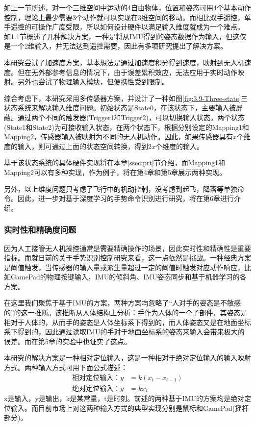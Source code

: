 如上一节所述，对一个三维空间中运动的4自由物体，位置和姿态可用4个基本动作控制，理论上最少需要3个动作就可以实现在3维空间的移动。而相比双手遥控，单手遥控的可操作广度受限，所以如何设计硬件以满足输入维度就成为一个难点。
如1.1节概述了几种解决方案，一种是将从IMU得到的姿态数据作为输入，但这仅是一个2维输入，并无法达到遥控需要，因此有多项研究提出了解决方案\cites{mughees2020gesture,budiyanto2021navigation,muezzinouglu2021intelligent,lee2023wearable,cherpillod2019embodied,kim2022intuitive}。

本研究尝试了加速度方案，基本想法是通过加速度积分得到速度，映射到无人机速度。但在无外部参考信息的情况下，由于误差累积效应，无法应用于实时动作映射。另外也尝试了物理输入模块，但便携性受到限制。

综合考虑下，本研究采用多传感器方案，并设计了一种如图\ref{fig:3.9-Three-state}三状态系统来解决输入维度问题。初始状态是State0，在该状态下，主要输入被屏蔽。通过两个不同的触发器(Trigger1和Trigger2)，可以切换输入状态。两个状态(State1和State2)为可接收输入状态，在两个状态下，根据分别设定的Mapping1和Mapping2，传感器输入被映射为不同的无人机动作。因此，如果传感器具有$x$个维度的输入，则可通过上面的状态空间转换，得到$2x$个维度的输入。

基于该状态系统的具体硬件实现将在本章\ref{ssec:prt}节介绍，而Mapping1和Mapping2可以有多种实现，作为例子，将在第4章和第5章展示两种实现。

另外，以上维度问题只考虑了飞行中的机动控制，没考虑到起飞，降落等单独命令。因此，进一步对基于深度学习的手势命令识别进行研究，将在第6章进行介绍。

\subsubsection{实时性和精确度问题}

因为人工接管无人机操控通常是需要精确操作的场景，因此实时性和精确性是重要指标。而就日前的关于手势识别控制研究来看，这一点依然是挑战。一种经典方案是阈值触发，当传感器的输入量或派生量超过一定的阈值时触发对应动作响应，比如GamePad的物理按键输入，IMU的倾斜角\cites{covaciu2022control}、IMU姿态同步\cites{kim2022intuitive}和基于机器学习的各方案。

在这里我们聚焦于基于IMU的方案，两种方案均忽略了“人对手的姿态是不敏感的”的这一推断。该推断从人体结构上分析：手作为人体的一个子部件，其姿态是相对于人体的，从而手的姿态是人体坐标系下得到的，而人体姿态又是在地面坐标系下得到的，因此通过读取IMU的手对于地面坐标系的姿态来输入会带来极大的误差。而在第5章的实验中也证实了这点。

本研究的解决方案是一种相对定位输入，这是一种相对于绝对定位输入的输入映射方式。两种输入方式可用下面公式描述：
\begin{align}
    \text{相对定位输入：}y &= k(x_t-x_{t-1})\\
    \text{绝对定位输入：}y &= kx_t
\end{align}
x是输入，y是输出，k是某常量，t是时刻。前述的两种基于IMU的方案均是绝对定位输入。而目前市场上对这两种输入方式的典型实现分别是鼠标和GamePad(摇杆部分)。

